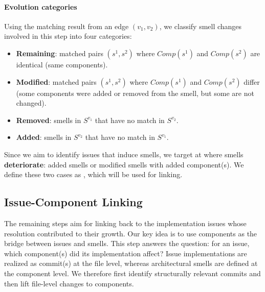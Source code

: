 \paragraph{Evolution categories}
Using the matching result from an edge $(v_1, v_2)$, we classify smell changes involved in this step into four categories:
\begin{itemize}[leftmargin=*]
    \item \textbf{Remaining}: matched pairs $(s^1, s^2)$ where $\mathit{Comp}(s^1)$ and $\mathit{Comp}(s^2)$ are identical (same components).
    \item \textbf{Modified}: matched pairs $(s^1, s^2)$ where $\mathit{Comp}(s^1)$ and $\mathit{Comp}(s^2)$ differ (some components were added or removed from the smell, but some are not changed).
    \item \textbf{Removed}: smells in $S^{v_1}$ that have no match in $S^{v_2}$.
    \item \textbf{Added}: smells in $S^{v_2}$ that have no match in $S^{v_1}$.
\end{itemize}

Since we aim to identify issues that induce smells, we target at where smells \textbf{deteriorate}: added smells or modified smells with added component(s). 
We define these two cases as \gs, which will be used for linking.


\subsection{Issue-Component Linking}
\label{subsec:issue-linking}
The remaining steps aim for linking \gs back to the implementation issues whose resolution contributed to their growth.
Our key idea is to use components as the bridge between issues and smells.
This step answers the question: for an issue, which component(s) did its implementation affect?
Issue implementations are realized as commit(s) at the file level, whereas architectural smells are defined at the component level.
We therefore first identify structurally relevant commits and then lift file-level changes to components.


